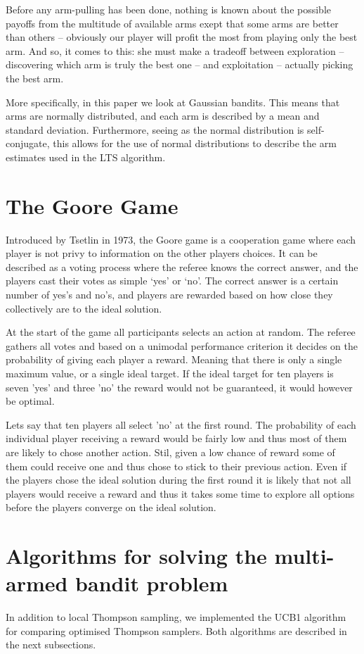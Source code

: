 Before any arm-pulling has been done, nothing is known about the possible 
payoffs from the multitude of available arms exept that some arms are better 
than others -- obviously our player will profit the most from playing only the 
best arm. And so, it comes to this: she must make a tradeoff between exploration 
-- discovering which arm is truly the best one -- and exploitation -- actually 
picking the best arm.

More specifically, in this paper we look at Gaussian bandits.
This means that arms are normally distributed, and each arm is described by a mean and standard deviation.
Furthermore, seeing as the normal distribution is self-conjugate, this allows for the
use of normal distributions to describe the arm estimates used in the LTS algorithm.

\section{The Goore Game}
Introduced by Tsetlin in 1973, the Goore game is a cooperation game where each  
player is not privy to information on the other players choices. It can be 
described as a voting process where the referee knows the correct answer, and 
the players cast their votes as simple ‘yes’ or ‘no’. The correct answer is a 
certain number of yes’s and no’s, and players are rewarded based on how close 
they collectively are to the ideal solution.

At the start of the game all participants selects an action at random. The referee
gathers all votes and based on a unimodal performance criterion it decides on
the probability of giving each player a reward. Meaning that there is only a single
maximum value, or a single ideal target. If the ideal target for ten players is
seven 'yes' and three 'no' the reward would not be guaranteed, it would however be
optimal. 

Lets say that ten players all select 'no' at the first round. The probability of
each individual player receiving a reward would be fairly low and thus most of them
are likely to chose another action. Stil, given a low chance of reward some of them
could receive one and thus chose to stick to their previous action. Even if the players
chose the ideal solution during the first round it is likely that not all players would
receive a reward and thus it takes some time to explore all options before the players
converge on the ideal solution.

\section{Algorithms for solving the multi-armed bandit problem}
In addition to local Thompson sampling, we implemented the UCB1 algorithm for 
comparing optimised Thompson samplers. Both algorithms are described in the next 
subsections.


